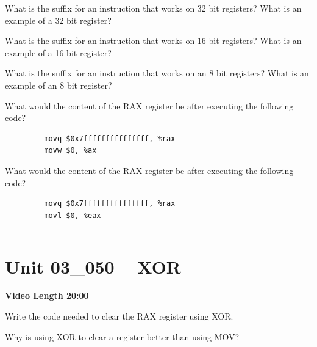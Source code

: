 \documentclass[letterpaper,12pt]{exam}
\newcommand{\unit}{Unit 03}
\begin{document}
\begin{questions}
\begin{samepage}
    \vspace{5mm}
\end{samepage}
\par
\begin{samepage}
    \question What is the suffix for an instruction that works on 32 bit registers?  What is an example of a 32 bit register?     
    \vspace{5mm}
\end{samepage}
\par
\begin{samepage}
    \question What is the suffix for an instruction that works on 16 bit registers?  What is an example of a 16 bit register?     
    \vspace{5mm}
\end{samepage}
\par
\begin{samepage}
    \question What is the suffix for an instruction that works on an 8 bit registers?  What is an example of an 8 bit register?
    \vspace{5mm}
\end{samepage}
\par
\begin{samepage}
    \question What would the content of the RAX register be after executing the following code?
    \begin{verbatim}
         movq $0x7fffffffffffffff, %rax
         movw $0, %ax      
    \end{verbatim}
    \vspace{5mm}
\end{samepage}
\par
 \par
\begin{samepage}
    \question What would the content of the RAX register be after executing the following code?
    \begin{verbatim}
         movq $0x7fffffffffffffff, %rax
         movl $0, %eax      
    \end{verbatim}
    \vspace{5mm}
\end{samepage}
\rule{0.5\textwidth}{.4pt} %
\section*{\unit\_050 -- XOR}
\par{\selectfont\textbf{Video Length 20:00 }}
\begin{samepage}
    \question Write the code needed to clear the RAX register using XOR.
    \vspace{5mm}
\end{samepage}
\par
\begin{samepage}
    \question Why is using XOR to clear a register better than using MOV?
    \vspace{5mm}
\end{samepage}
\par

\end{questions}
\end{document}
